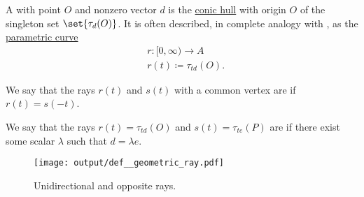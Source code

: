 \begin{definition}\label{def:geometric_ray}\mimprovised
  A  with  point \( O \) and nonzero  vector \( d \) is the \hyperref[def:conic_hull]{conic hull} with origin \( O \) of the singleton set \( \set{ \tau_d(O) } \). It is often described, in complete analogy with , as the \hyperref[def:parametric_curve]{parametric curve}
  \begin{equation*}
    \begin{aligned}
       &r: [0, \infty) \to A \\
       &r(t) \coloneqq \tau_{td}(O).
    \end{aligned}
  \end{equation*}

  \begin{thmenum}
     We say that the rays \( r(t) \) and \( s(t) \) with a common vertex are  if \( r(t) = s(-t) \).

     We say that the rays \( r(t) = \tau_{t d}(O) \) and \( s(t) = \tau_{t e}(P) \) are  if there exist some  scalar \( \lambda \) such that \( d = \lambda e \).
  \end{thmenum}

  \begin{figure}[!ht]
    \centering
    \texttt{[image: output/def\_\_geometric\_ray.pdf]}
    \caption{Unidirectional and opposite rays.}\label{fig:def:geometric_ray}
  \end{figure}
\end{definition}

